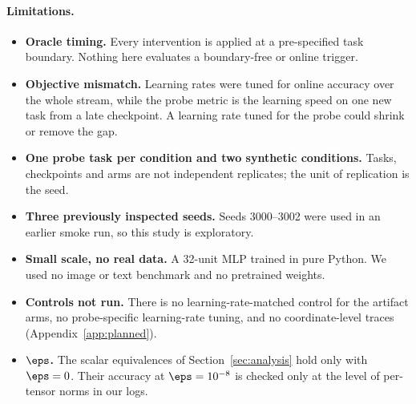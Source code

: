 \paragraph{Limitations.}
\begin{itemize}
\item \textbf{Oracle timing.} Every intervention is applied at a pre-specified task boundary. Nothing here
evaluates a boundary-free or online trigger.
\item \textbf{Objective mismatch.} Learning rates were tuned for online accuracy over the whole stream,
while the probe metric is the learning speed on one new task from a late checkpoint. A learning rate
tuned for the probe could shrink or remove the gap.
\item \textbf{One probe task per condition and two synthetic conditions.} Tasks, checkpoints and arms
are not independent replicates; the unit of replication is the seed.
\item \textbf{Three previously inspected seeds.} Seeds 3000--3002 were used in an earlier smoke run, so
this study is exploratory.
\item \textbf{Small scale, no real data.} A 32-unit MLP trained in pure Python. We used no image or text
benchmark and no pretrained weights.
\item \textbf{Controls not run.} There is no learning-rate-matched control for the artifact arms, no
probe-specific learning-rate tuning, and no coordinate-level traces (Appendix~\ref{app:planned}).
\item \textbf{$\eps$.} The scalar equivalences of Section~\ref{sec:analysis} hold only with $\eps=0$.
Their accuracy at $\eps=10^{-8}$ is checked only at the level of per-tensor norms in our logs.
\end{itemize}

